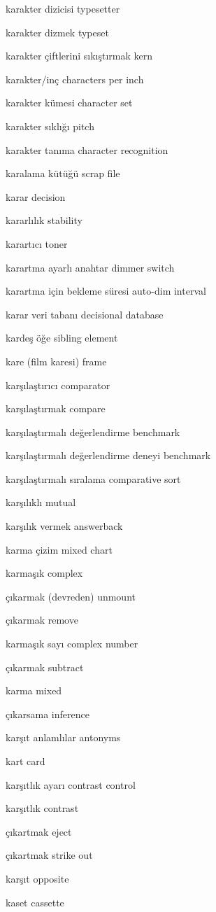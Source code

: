 \documentclass[12pt,fleqn]{article}\usepackage{../../common}
\begin{document}
karakter dizicisi typesetter

karakter dizmek typeset

karakter çiftlerini sıkıştırmak kern

karakter/inç characters per inch

karakter kümesi character set

karakter sıklığı pitch

karakter tanıma character recognition

karalama kütüğü scrap file

karar decision

kararlılık stability

karartıcı toner

karartma ayarlı anahtar dimmer switch

karartma için bekleme süresi auto-dim interval

karar veri tabanı decisional database

kardeş öğe sibling element

kare (film karesi) frame

karşılaştırıcı comparator

karşılaştırmak compare

karşılaştırmalı değerlendirme benchmark

karşılaştırmalı değerlendirme deneyi benchmark

karşılaştırmalı sıralama comparative sort

karşılıklı mutual

karşılık vermek answerback

karma çizim mixed chart

karmaşık complex

çıkarmak (devreden) unmount

çıkarmak remove

karmaşık sayı complex number

çıkarmak subtract

karma mixed

çıkarsama inference

karşıt anlamlılar antonyms

kart card

karşıtlık ayarı contrast control

karşıtlık contrast

çıkartmak eject

çıkartmak strike out

karşıt opposite

kaset cassette
\end{document}
